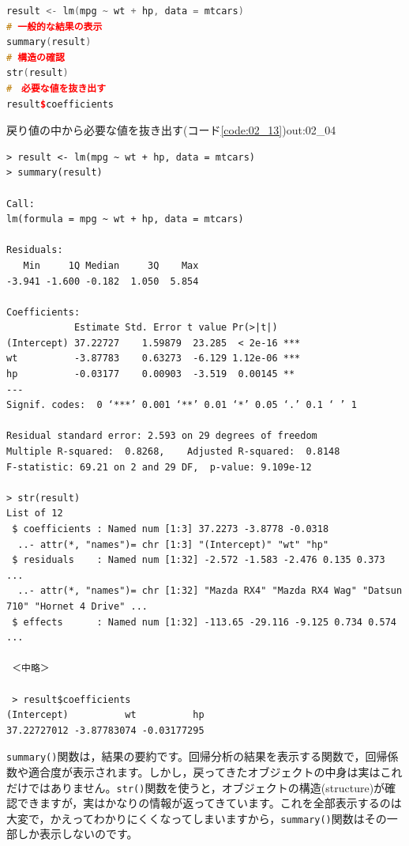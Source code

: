 \documentclass{ltjsbook}
\begin{document}
\begin{lstlisting}[language=c++,label={code:02_13},caption={戻り値の中から必要な値を抜き出す}]
result <- lm(mpg ~ wt + hp, data = mtcars)
# 一般的な結果の表示
summary(result)
# 構造の確認
str(result)
#　必要な値を抜き出す
result$coefficients
\end{lstlisting}

\begin{Rscreen}{戻り値の中から必要な値を抜き出す(コード\ref{code:02_13})}{out:02_04}
	\begin{verbatim}
> result <- lm(mpg ~ wt + hp, data = mtcars)
> summary(result)

Call:
lm(formula = mpg ~ wt + hp, data = mtcars)

Residuals:
   Min     1Q Median     3Q    Max 
-3.941 -1.600 -0.182  1.050  5.854 

Coefficients:
            Estimate Std. Error t value Pr(>|t|)    
(Intercept) 37.22727    1.59879  23.285  < 2e-16 ***
wt          -3.87783    0.63273  -6.129 1.12e-06 ***
hp          -0.03177    0.00903  -3.519  0.00145 ** 
---
Signif. codes:  0 ‘***’ 0.001 ‘**’ 0.01 ‘*’ 0.05 ‘.’ 0.1 ‘ ’ 1

Residual standard error: 2.593 on 29 degrees of freedom
Multiple R-squared:  0.8268,	Adjusted R-squared:  0.8148 
F-statistic: 69.21 on 2 and 29 DF,  p-value: 9.109e-12

> str(result)
List of 12
 $ coefficients : Named num [1:3] 37.2273 -3.8778 -0.0318
  ..- attr(*, "names")= chr [1:3] "(Intercept)" "wt" "hp"
 $ residuals    : Named num [1:32] -2.572 -1.583 -2.476 0.135 0.373 ...
  ..- attr(*, "names")= chr [1:32] "Mazda RX4" "Mazda RX4 Wag" "Datsun 710" "Hornet 4 Drive" ...
 $ effects      : Named num [1:32] -113.65 -29.116 -9.125 0.734 0.574 ...

 ＜中略＞

 > result$coefficients
(Intercept)          wt          hp 
37.22727012 -3.87783074 -0.03177295 

\end{verbatim}
\end{Rscreen}

\verb|summary()|関数は，結果の要約です。回帰分析の結果を表示する関数で，回帰係数や適合度が表示されます。しかし，戻ってきたオブジェクトの中身は実はこれだけではありません。\verb|str()|関数を使うと，オブジェクトの構造(structure)が確認できますが，実はかなりの情報が返ってきています。これを全部表示するのは大変で，かえってわかりにくくなってしまいますから，\verb|summary()|関数はその一部しか表示しないのです。
\end{document}
